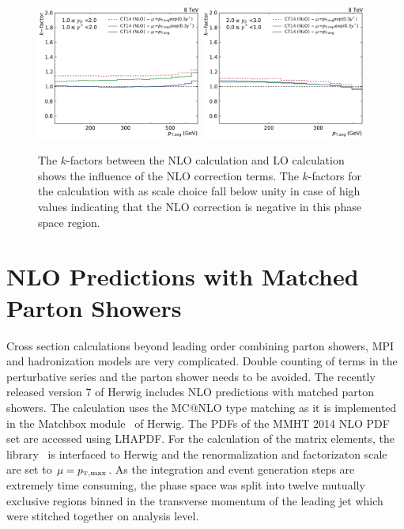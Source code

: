 \begin{figure}[htp]
    \includegraphics[width=0.48\textwidth]{figures/theory/kfactor_comp_yb1ys1.pdf}\hfill
    \includegraphics[width=0.48\textwidth]{figures/theory/kfactor_comp_yb2ys0.pdf}
    \caption[NLO $k$-factors of fastNLO calculation]{The $k$-factors between the NLO calculation and LO calculation
        shows the influence of the NLO correction terms. The $k$-factors for the
        calculation with \ptavg as scale choice fall below unity in case of high
        \ystar values indicating that the NLO correction is negative in this
        phase space region.}
    \label{fig:kfactor_comp}
\end{figure}

\section{NLO Predictions with Matched Parton Showers}

Cross section calculations beyond leading order combining parton showers, MPI
and hadronization models are very complicated. Double counting of terms in the
perturbative series and the parton shower needs to be avoided. The recently
released version 7 of Herwig includes NLO predictions with matched parton
showers.  The calculation uses the MC@NLO type matching as it is implemented in
the Matchbox module~\cite{Platzer:2011bc} of Herwig. The PDFs of the MMHT 2014
NLO PDF set are accessed using LHAPDF. For the calculation of the matrix
elements, the \NJET library~\cite{Badger:2012pg} is interfaced to Herwig and the
renormalization and factorizaton scale are set to $\mu = \ptmax$. As the
integration and event generation steps are extremely time consuming, the phase
space was split into twelve mutually exclusive regions binned in the transverse
momentum of the leading jet which were stitched together on analysis level.

